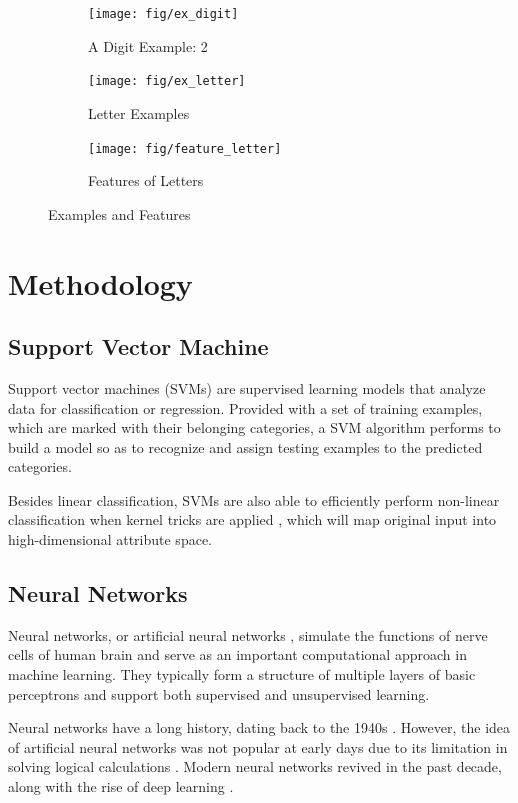 \documentclass[11pt]{article}
\begin{document}
\begin{figure}[htbp]
\centering

\begin{subfigure}[htbp]{0.32\columnwidth}
\texttt{[image: fig/ex\_digit]}
\caption{A Digit Example: 2}
\label{fig:ex:digit}
\end{subfigure}
\hfill
\begin{subfigure}[htbp]{0.32\columnwidth}
\texttt{[image: fig/ex\_letter]}
\caption{Letter Examples}
\label{fig:ex:letter}
\end{subfigure}
\hfill
\begin{subfigure}[htbp]{0.32\columnwidth}
\texttt{[image: fig/feature\_letter]}
\caption{Features of Letters}
\label{fig:feature:letter}
\end{subfigure}
\caption{Examples and Features}
\end{figure}

\section{Methodology}\label{sec:metho}

\subsection{Support Vector Machine}
Support vector machines (SVMs) \cite{cortes1995support} are supervised learning models that analyze data for classification or regression. Provided with a set of training examples, which are marked with their belonging categories, a SVM algorithm performs to build a model so as to recognize and assign testing examples to the predicted categories. 

Besides linear classification, SVMs are also able to efficiently perform non-linear classification when kernel tricks are applied\cite{boser1992training} , which will map original input into high-dimensional attribute space.

\subsection{Neural Networks}
Neural networks, or artificial neural networks \cite{hagan1996neural}, simulate the functions of nerve cells of human brain and serve as an important computational approach in machine learning. They typically form a structure of multiple layers of basic perceptrons and support both supervised and unsupervised learning.

Neural networks have a long history, dating back to the 1940s \cite{mcculloch1943logical}. However, the idea of artificial neural networks was not popular at early days due to its limitation in solving logical calculations \cite{minsky1988perceptrons}. Modern neural networks revived in the past decade, along with the rise of deep learning \cite{bengio2009learning, schmidhuber2015deep}.
\end{document}
